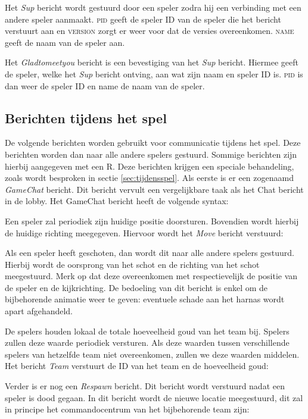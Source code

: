 Het \emph{Sup} bericht wordt gestuurd door een speler zodra hij een verbinding met een andere speler aanmaakt. \textsc{pid} geeft de speler ID van de speler die het bericht verstuurt aan en \textsc{version} zorgt er weer voor dat de versies overeenkomen. \textsc{name} geeft de naam van de speler aan.

Het \emph{Gladtomeetyou} bericht is een bevestiging van het \emph{Sup} bericht. Hiermee geeft de speler, welke het \emph{Sup} bericht ontving, aan wat zijn naam en speler ID is. \textsc{pid} is dan weer de speler ID en name de naam van de speler.

\subsection{Berichten tijdens het spel}
De volgende berichten worden gebruikt voor communicatie tijdens het spel. Deze berichten worden dan naar alle andere spelers gestuurd. Sommige berichten zijn hierbij aangegeven met een R. Deze berichten krijgen een speciale behandeling, zoals wordt besproken in sectie \ref{sec:tijdensspel}. Als eerste is er een zogenaamd \emph{GameChat} bericht. Dit bericht vervult een vergelijkbare taak als het Chat bericht in de lobby. Het GameChat bericht heeft de volgende syntax:

Een speler zal periodiek zijn huidige positie doorsturen. Bovendien wordt hierbij de huidige richting meegegeven. Hiervoor wordt het \emph{Move} bericht verstuurd:

Als een speler heeft geschoten, dan wordt dit naar alle andere spelers gestuurd. Hierbij wordt de oorsprong van het schot en de richting van het schot meegestuurd. Merk op dat deze overeenkomen met respectievelijk de positie van de speler en de kijkrichting. De bedoeling van dit bericht is enkel om de bijbehorende animatie weer te geven: eventuele schade aan het harnas wordt apart afgehandeld.

De spelers houden lokaal de totale hoeveelheid goud van het team bij. Spelers zullen deze waarde periodiek versturen. Als deze waarden tussen verschillende spelers van hetzelfde team niet overeenkomen, zullen we deze waarden middelen. Het bericht \emph{Team} verstuurt de ID van het team en de hoeveelheid goud:

Verder is er nog een \emph{Respawn} bericht. Dit bericht wordt verstuurd nadat een speler is dood gegaan. In dit bericht wordt de nieuwe locatie meegestuurd, dit zal in principe het commandocentrum van het bijbehorende team zijn:

